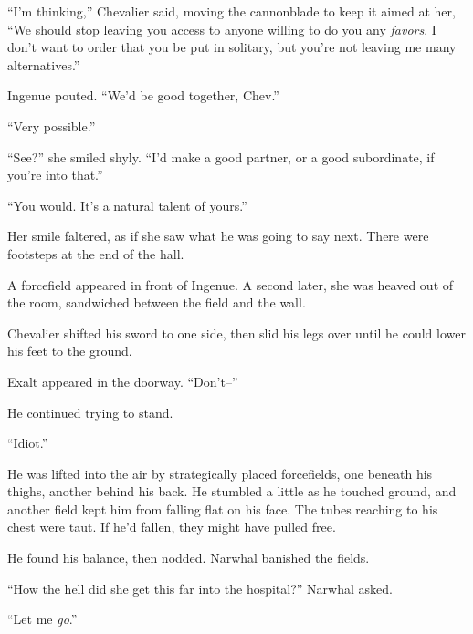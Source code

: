 ``I'm thinking,'' Chevalier said, moving the cannonblade to keep it aimed at her, ``We should stop leaving you access to anyone willing to do you any \emph{favors}.  I don't want to order that you be put in solitary, but you're not leaving me many alternatives.''



Ingenue pouted.  ``We'd be good together, Chev.''



``Very possible.''



``See?'' she smiled shyly.  ``I'd make a good partner, or a good subordinate, if you're into that.''



``You would.  It's a natural talent of yours.''



Her smile faltered, as if she saw what he was going to say next.  There were footsteps at the end of the hall.



A forcefield appeared in front of Ingenue.  A second later, she was heaved out of the room, sandwiched between the field and the wall.



Chevalier shifted his sword to one side, then slid his legs over until he could lower his feet to the ground.



Exalt appeared in the doorway.  ``Don't--''



He continued trying to stand.



``Idiot.''



He was lifted into the air by strategically placed forcefields, one beneath his thighs, another behind his back.  He stumbled a little as he touched ground, and another field kept him from falling flat on his face.  The tubes reaching to his chest were taut.  If he'd fallen, they might have pulled free.



He found his balance, then nodded.  Narwhal banished the fields.



``How the hell did she get this far into the hospital?'' Narwhal asked.



``Let me \emph{go}.''



